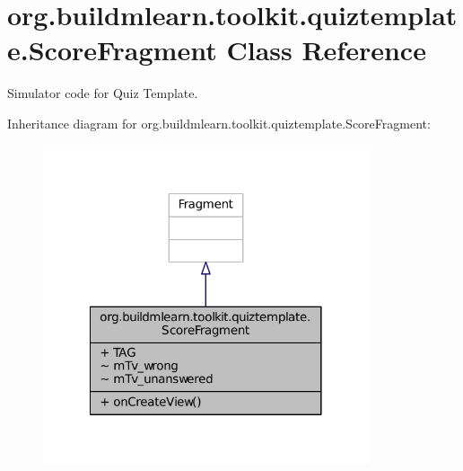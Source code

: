 \hypertarget{classorg_1_1buildmlearn_1_1toolkit_1_1quiztemplate_1_1ScoreFragment}{\section{org.\-buildmlearn.\-toolkit.\-quiztemplate.\-Score\-Fragment Class Reference}
\label{classorg_1_1buildmlearn_1_1toolkit_1_1quiztemplate_1_1ScoreFragment}
}


Simulator code for Quiz Template.  




Inheritance diagram for org.\-buildmlearn.\-toolkit.\-quiztemplate.\-Score\-Fragment\-:
\nopagebreak
\begin{figure}[H]
\begin{center}
\leavevmode
\includegraphics[width=272pt]{dc/d96/classorg_1_1buildmlearn_1_1toolkit_1_1quiztemplate_1_1ScoreFragment__inherit__graph}
\end{center}
\end{figure}


